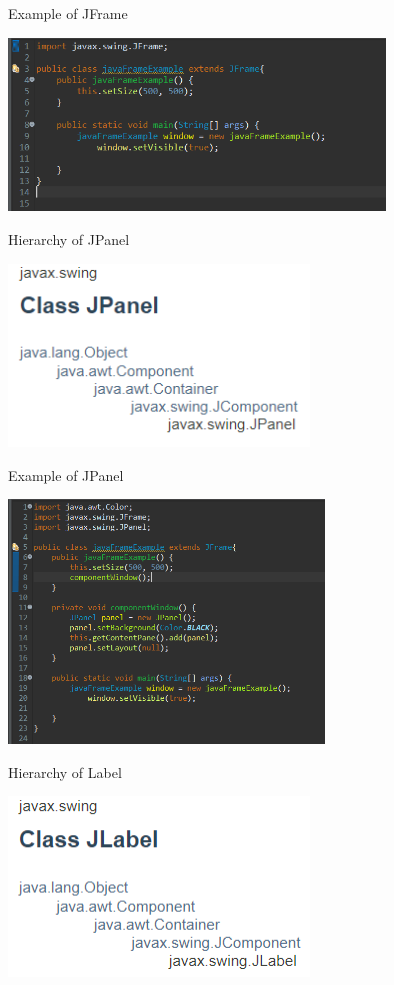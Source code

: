 \documentclass[11pt]{beamer}
\begin{document}
	\begin{frame}{Example of JFrame}
		\begin{center}
			\includegraphics[width=10cm]{images/example1}
		\end{center}
	\end{frame}
	\begin{frame}{Hierarchy of JPanel}
		\begin{center}
			\includegraphics[width=8cm]{images/hierarpan}
		\end{center}
	\end{frame}
	\begin{frame}{Example of JPanel}
		\begin{center}
			\includegraphics[width=8.4cm]{images/example2}
		\end{center}
	\end{frame}
	\begin{frame}{Hierarchy of Label}
		\begin{center}
			\includegraphics[width=8cm]{images/hierlab}
		\end{center}
	\end{frame}
\end{document}
